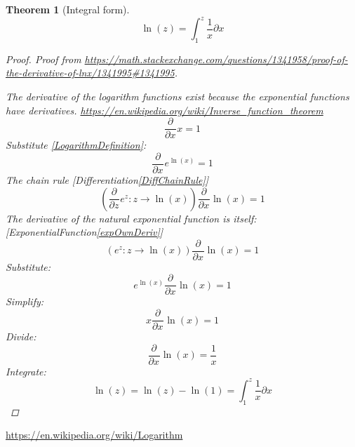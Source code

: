 \documentclass[]{article}
\newcommand{\pqty}[1]{{\left(#1\right)}}
\newcommand{\pdiff}[2]{\frac{\partial^{#2}}{\partial #1^{#2}}}
\newtheorem{theorem}{Theorem}[section]
\numberwithin{equation}{section}
\begin{document}
	\begin{theorem}[Integral form]
		\begin{equation}
		\label{LnIntegralForm}
		\ln\pqty{z}=\int_{1}^{z}\frac{1}{x}\partial x
		\end{equation}
	\begin{proof}
		Proof from \url{https://math.stackexchange.com/questions/1341958/proof-of-the-derivative-of-lnx/1341995#1341995}.
		
		The derivative of the logarithm functions exist because the exponential functions have derivatives.
		\url{https://en.wikipedia.org/wiki/Inverse_function_theorem}
		\begin{equation}
		\pdiff{x}{}x=1
		\end{equation}
		Substitute \eqref{LogarithmDefinition}:
		\begin{equation}
		\pdiff{x}{}e^{\ln\pqty{x}}=1
		\end{equation}
		The chain rule [Differentiation\eqref{DiffChainRule}]
		\begin{equation}
		\pqty{\pdiff{z}{}e^{z}:z\to \ln\pqty{x}}\pdiff{x}{}{\ln\pqty{x}}=1
		\end{equation}
		The derivative of the natural exponential function is itself: [ExponentialFunction\eqref{expOwnDeriv}]
		\begin{equation}
		\pqty{e^{z}:z\to \ln\pqty{x}}\pdiff{x}{}{\ln\pqty{x}}=1
		\end{equation}
		Substitute:
		\begin{equation}
		e^{\ln\pqty{x}}\pdiff{x}{}{\ln\pqty{x}}=1
		\end{equation}
		Simplify:
		\begin{equation}
		x\pdiff{x}{}{\ln\pqty{x}}=1
		\end{equation}
		Divide:
		\begin{equation}
		\pdiff{x}{}{\ln\pqty{x}}=\frac{1}{x}
		\end{equation}
		Integrate:
		\begin{equation}
		\ln\pqty{z}={\ln\pqty{z}-\ln\pqty{1}}=\int_{1}^{z}\frac{1}{x}\partial x
		\end{equation}
		
	\end{proof}
	\end{theorem}


	
	
	\url{https://en.wikipedia.org/wiki/Logarithm}
\end{document}
